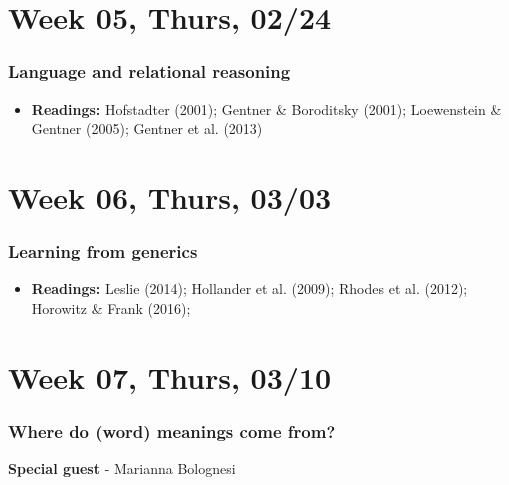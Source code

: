 \documentclass[11pt,man]{article}
\providecommand{\tightlist}{%
  \setlength{\itemsep}{0pt}\setlength{\parskip}{0pt}}
\begin{document}
\hypertarget{week-05-thurs-0224}{%
\section{Week 05, Thurs, 02/24}\label{week-05-thurs-0224}}

\hypertarget{language-and-relational-reasoning}{%
\subsubsection{Language and relational
reasoning}\label{language-and-relational-reasoning}}

\begin{itemize}
\tightlist
\item
  \textbf{Readings:} Hofstadter (2001); Gentner \& Boroditsky (2001);
  Loewenstein \& Gentner (2005); Gentner et al. (2013)
\end{itemize}

\hypertarget{week-06-thurs-0303}{%
\section{Week 06, Thurs, 03/03}\label{week-06-thurs-0303}}

\hypertarget{learning-from-generics}{%
\subsubsection{Learning from generics}\label{learning-from-generics}}

\begin{itemize}
\tightlist
\item
  \textbf{Readings:} Leslie (2014); Hollander et al. (2009); Rhodes et
  al. (2012); Horowitz \& Frank (2016);
\end{itemize}

\hypertarget{week-07-thurs-0310}{%
\section{Week 07, Thurs, 03/10}\label{week-07-thurs-0310}}

\hypertarget{where-do-word-meanings-come-from}{%
\subsubsection{Where do (word) meanings come
from?}\label{where-do-word-meanings-come-from}}

\textbf{Special guest} - Marianna Bolognesi
\end{document}
